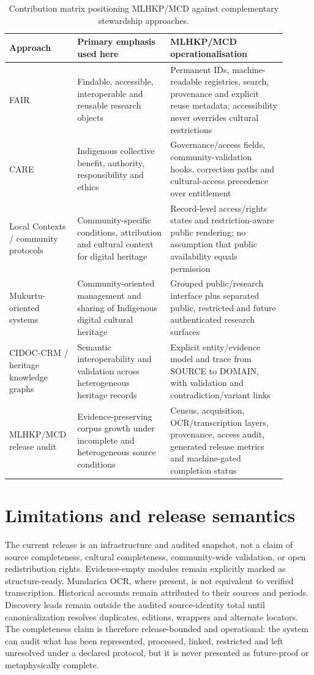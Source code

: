 \documentclass[11pt]{article}
\begin{document}
\begin{table}[ht]
\caption{Contribution matrix positioning MLHKP/MCD against complementary stewardship approaches.}
\label{tab:contribution}
\centering
\small
\begin{tabular}{p{0.18\linewidth}p{0.32\linewidth}p{0.40\linewidth}}
\toprule
Approach & Primary emphasis used here & MLHKP/MCD operationalisation \\
\midrule
FAIR & Findable, accessible, interoperable and reusable research objects & Permanent IDs, machine-readable registries, search, provenance and explicit reuse metadata; accessibility never overrides cultural restrictions \\
CARE & Indigenous collective benefit, authority, responsibility and ethics & Governance/access fields, community-validation hooks, correction paths and cultural-access precedence over entitlement \\
Local Contexts / community protocols & Community-specific conditions, attribution and cultural context for digital heritage & Record-level access/rights states and restriction-aware public rendering; no assumption that public availability equals permission \\
Mukurtu-oriented systems & Community-oriented management and sharing of Indigenous digital cultural heritage & Grouped public/research interface plus separated public, restricted and future authenticated research surfaces \\
CIDOC-CRM / heritage knowledge graphs & Semantic interoperability and validation across heterogeneous heritage records & Explicit entity/evidence model and trace from SOURCE to DOMAIN, with validation and contradiction/variant links \\
MLHKP/MCD release audit & Evidence-preserving corpus growth under incomplete and heterogeneous source conditions & Census, acquisition, OCR/transcription layers, provenance, access audit, generated release metrics and machine-gated completion status \\
\bottomrule
\end{tabular}
\end{table}

\section{Limitations and release semantics}
The current release is an infrastructure and audited snapshot, not a claim of source completeness, cultural completeness, community-wide validation, or open redistribution rights. Evidence-empty modules remain explicitly marked as structure-ready. Mundarica OCR, where present, is not equivalent to verified transcription. Historical accounts remain attributed to their sources and periods. Discovery leads remain outside the audited source-identity total until canonicalization resolves duplicates, editions, wrappers and alternate locators. The completeness claim is therefore release-bounded and operational: the system can audit what has been represented, processed, linked, restricted and left unresolved under a declared protocol, but it is never presented as future-proof or metaphysically complete.
\end{document}
